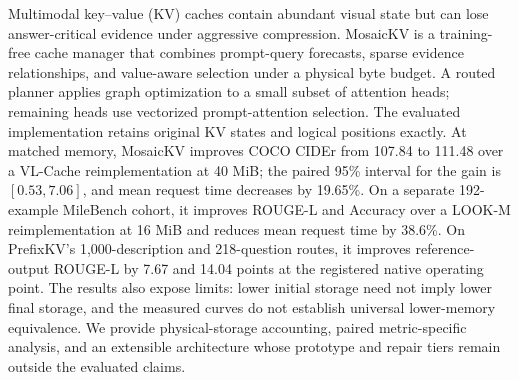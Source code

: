 Multimodal key--value (KV) caches contain abundant visual state but can lose
answer-critical evidence under aggressive compression. MosaicKV is a
training-free cache manager that combines prompt-query forecasts, sparse
evidence relationships, and value-aware selection under a physical byte
budget. A routed planner applies graph optimization to a small subset of
attention heads; remaining heads use vectorized prompt-attention selection.
The evaluated implementation retains original KV states and logical positions
exactly. At matched memory, MosaicKV improves COCO CIDEr from 107.84 to 111.48
over a VL-Cache reimplementation at 40 MiB; the paired 95\% interval for the
gain is $[0.53,7.06]$, and mean request time decreases by 19.65\%.
On a separate 192-example MileBench cohort, it improves ROUGE-L and Accuracy
over a LOOK-M reimplementation at 16 MiB and reduces mean request time by
38.6\%. On PrefixKV's 1,000-description and 218-question routes, it improves
reference-output ROUGE-L by 7.67 and 14.04 points at the registered native
operating point. The results also expose limits: lower initial storage need
not imply lower final storage, and the measured curves do not establish
universal lower-memory equivalence. We provide physical-storage accounting,
paired metric-specific analysis, and an extensible architecture whose
prototype and repair tiers remain outside the evaluated claims.
